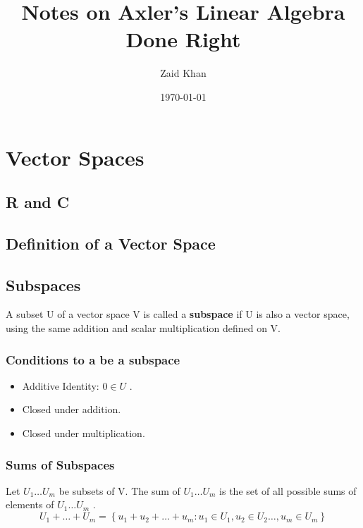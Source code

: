 \documentclass{article}
\title{Notes on Axler's Linear Algebra Done Right}
\author{Zaid Khan}
\date{\today}
\begin{document}
\maketitle

\clearpage


\tableofcontents


\clearpage


\section{Vector Spaces}
\subsection{R and C}
\subsection{Definition of a Vector Space}
\subsection{Subspaces}
A subset U of a vector space V is called a \textbf{subspace} if U is also a vector space, using the same addition and scalar multiplication defined on V.

\subsubsection{Conditions to a be a subspace}

\begin{itemize}

\item Additive Identity: \( 0 \in U \) .

\item Closed under addition.

\item Closed under multiplication.

\end{itemize}

\subsubsection{Sums of Subspaces}

Let \( U_{1} \ldots U_{m}     \) be subsets of V. The sum of \( U_{1} \ldots U_{m}     \) is the set of all possible sums of elements of \( U_{1} \ldots U_{m}     \) . 
\[U_{1} + \ldots + U_{m} = \left \{   u_{1} + u_{2} + \ldots + u_{m} : u_{1} \in U_{1} , u_{2} \in U _{2} \ldots , u_{m} \in U_{m}                      \right \} \]
\end{document}
